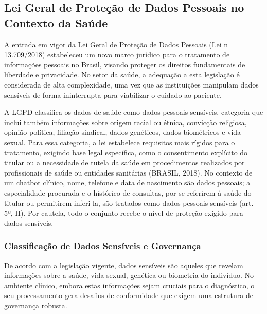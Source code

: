 \documentclass[12pt,a4paper]{extarticle}
\begin{document}
\subsection{Lei Geral de Proteção de Dados Pessoais no Contexto da Saúde}
\label{sec:lgpd}

A entrada em vigor da Lei Geral de Proteção de Dados Pessoais (Lei n\textordmasculine{} 13.709/2018) estabeleceu um novo marco jurídico para o tratamento de informações pessoais no Brasil, visando proteger os direitos fundamentais de liberdade e privacidade. No setor da saúde, a adequação a esta legislação é considerada de alta complexidade, uma vez que as instituições manipulam dados sensíveis de forma ininterrupta para viabilizar o cuidado ao paciente.

A LGPD classifica os dados de saúde como dados pessoais sensíveis, categoria que inclui também informações sobre origem racial ou étnica, convicção religiosa, opinião política, filiação sindical, dados genéticos, dados biométricos e vida sexual. Para essa categoria, a lei estabelece requisitos mais rígidos para o tratamento, exigindo base legal específica, como o consentimento explícito do titular ou a necessidade de tutela da saúde em procedimentos realizados por profissionais de saúde ou entidades sanitárias (BRASIL, 2018). No contexto de um chatbot clínico, nome, telefone e data de nascimento são dados pessoais; a especialidade procurada e o histórico de consultas, por se referirem à saúde do titular ou permitirem inferi-la, são tratados como dados pessoais sensíveis (art. 5º, II). Por cautela, todo o conjunto recebe o nível de proteção exigido para dados sensíveis.

\subsubsection{Classificação de Dados Sensíveis e Governança}

De acordo com a legislação vigente, dados sensíveis são aqueles que revelam informações sobre a saúde, vida sexual, genética ou biometria do indivíduo. No ambiente clínico, embora estas informações sejam cruciais para o diagnóstico, o seu processamento gera desafios de conformidade que exigem uma estrutura de governança robusta.

\end{document}
